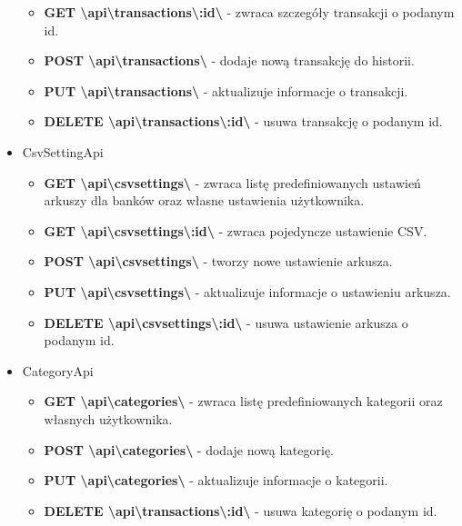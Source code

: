\documentclass{article}
\begin{document}
\begin{itemize}
\begin{itemize}
				\item \textbf{GET \textbackslash{api}\textbackslash{transactions}\textbackslash{:id}\textbackslash} - zwraca szczegóły transakcji o podanym id.
				\item \textbf{POST \textbackslash{api}\textbackslash{transactions}\textbackslash} - dodaje nową transakcję do historii.
				\item \textbf{PUT \textbackslash{api}\textbackslash{transactions}\textbackslash} - aktualizuje informacje o transakcji.
				\item \textbf{DELETE \textbackslash{api}\textbackslash{transactions}\textbackslash{:id}\textbackslash} - usuwa transakcję o podanym id.
			\end{itemize}
		\item CsvSettingApi
			\begin{itemize}
				\item \textbf{GET \textbackslash{api}\textbackslash{csvsettings}\textbackslash} - zwraca listę predefiniowanych ustawień arkuszy dla banków oraz własne ustawienia użytkownika.
				\item \textbf{GET \textbackslash{api}\textbackslash{csvsettings}\textbackslash{:id}\textbackslash} - zwraca pojedyncze ustawienie CSV.
				\item \textbf{POST \textbackslash{api}\textbackslash{csvsettings}\textbackslash} - tworzy nowe ustawienie arkusza.
				\item \textbf{PUT \textbackslash{api}\textbackslash{csvsettings}\textbackslash} - aktualizuje informacje o ustawieniu arkusza.
				\item \textbf{DELETE \textbackslash{api}\textbackslash{csvsettings}\textbackslash{:id}\textbackslash} - usuwa ustawienie arkusza o podanym id.
			\end{itemize}
		\item CategoryApi
			\begin{itemize}
				\item \textbf{GET \textbackslash{api}\textbackslash{categories}\textbackslash} - zwraca listę predefiniowanych kategorii oraz własnych użytkownika.
				\item \textbf{POST \textbackslash{api}\textbackslash{categories}\textbackslash} - dodaje nową kategorię.
				\item \textbf{PUT \textbackslash{api}\textbackslash{categories}\textbackslash} - aktualizuje informacje o kategorii.
				\item \textbf{DELETE \textbackslash{api}\textbackslash{transactions}\textbackslash{:id}\textbackslash} - usuwa kategorię o podanym id.
			\end{itemize}
	\end{itemize}
\end{document}
